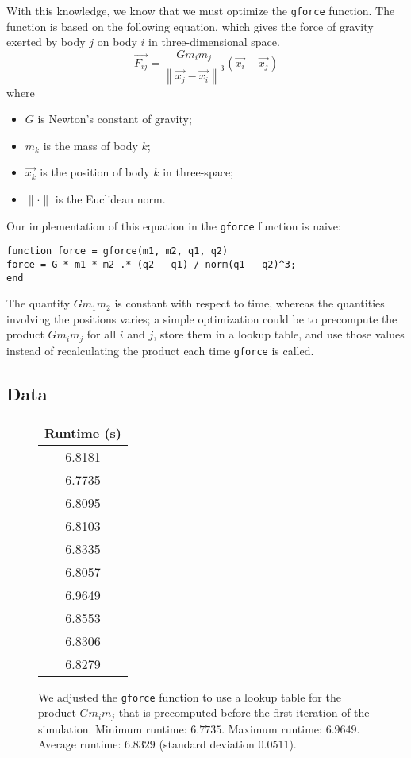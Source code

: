 \documentclass[11pt,letterpaper]{article}
\begin{document}
With this knowledge, we know that we must optimize the \texttt{gforce}
function. The function is based on the following equation, which gives the
force of gravity exerted by body $j$ on body $i$ in three-dimensional space.
\begin{equation}
    \vec{F_{ij}} =
    \frac{G m_i m_j}{\left\| \vec{x_j} - \vec{x_i} \right\|^3}
    \left(\vec{x_i} - \vec{x_j}\right)
    \label{eq:gravity}
\end{equation}
where
\begin{itemize}
    \item $G$ is Newton's constant of gravity;
    \item $m_k$ is the mass of body $k$;
    \item $\vec{x_k}$ is the position of body $k$ in three-space;
    \item $\|\cdot\|$ is the Euclidean norm.
\end{itemize}

Our implementation of this equation in the \texttt{gforce} function is naive:
\begin{verbatim}
function force = gforce(m1, m2, q1, q2)
force = G * m1 * m2 .* (q2 - q1) / norm(q1 - q2)^3;
end
\end{verbatim}
The quantity $G m_1 m_2$ is constant with respect to time, whereas the
quantities involving the positions varies; a simple optimization could be to
precompute the product $G m_i m_j$ for all $i$ and $j$, store them in a lookup
table, and use those values instead of recalculating the product each time
\texttt{gforce} is called.

\subsection{Data}

\begin{figure}[ht]
    \centering
    \begin{tabular}{|c|}
        \textbf{Runtime (s)} \\ \hline \hline
        6.8181 \\
        6.7735 \\
        6.8095 \\
        6.8103 \\
        6.8335 \\
        6.8057 \\
        6.9649 \\
        6.8553 \\
        6.8306 \\
        6.8279
    \end{tabular}

    \caption{
        We adjusted the \texttt{gforce} function to use a lookup table for the
        product $G m_i m_j$ that is precomputed before the first iteration of
        the simulation. Minimum runtime: $6.7735$. Maximum runtime: $6.9649$.
        Average runtime: $6.8329$ (standard deviation $0.0511$).
    }
    \label{data:optimizedrun}
\end{figure}
\end{document}
